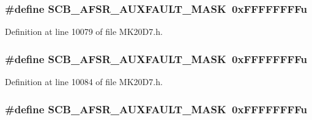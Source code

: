 \subsubsection[{\texorpdfstring{S\+C\+B\+\_\+\+A\+F\+S\+R\+\_\+\+A\+U\+X\+F\+A\+U\+L\+T\+\_\+\+M\+A\+SK}{SCB_AFSR_AUXFAULT_MASK}}]{\setlength{\rightskip}{0pt plus 5cm}\#define S\+C\+B\+\_\+\+A\+F\+S\+R\+\_\+\+A\+U\+X\+F\+A\+U\+L\+T\+\_\+\+M\+A\+SK~0x\+F\+F\+F\+F\+F\+F\+F\+Fu}\hypertarget{group___s_c_b___register___masks_ga7664f289a25c34670bd752c23fd47c8a}{}\label{group___s_c_b___register___masks_ga7664f289a25c34670bd752c23fd47c8a}


Definition at line 10079 of file M\+K20\+D7.\+h.

\subsubsection[{\texorpdfstring{S\+C\+B\+\_\+\+A\+F\+S\+R\+\_\+\+A\+U\+X\+F\+A\+U\+L\+T\+\_\+\+M\+A\+SK}{SCB_AFSR_AUXFAULT_MASK}}]{\setlength{\rightskip}{0pt plus 5cm}\#define S\+C\+B\+\_\+\+A\+F\+S\+R\+\_\+\+A\+U\+X\+F\+A\+U\+L\+T\+\_\+\+M\+A\+SK~0x\+F\+F\+F\+F\+F\+F\+F\+Fu}\hypertarget{group___s_c_b___register___masks_ga7664f289a25c34670bd752c23fd47c8a}{}\label{group___s_c_b___register___masks_ga7664f289a25c34670bd752c23fd47c8a}


Definition at line 10084 of file M\+K20\+D7.\+h.

\subsubsection[{\texorpdfstring{S\+C\+B\+\_\+\+A\+F\+S\+R\+\_\+\+A\+U\+X\+F\+A\+U\+L\+T\+\_\+\+M\+A\+SK}{SCB_AFSR_AUXFAULT_MASK}}]{\setlength{\rightskip}{0pt plus 5cm}\#define S\+C\+B\+\_\+\+A\+F\+S\+R\+\_\+\+A\+U\+X\+F\+A\+U\+L\+T\+\_\+\+M\+A\+SK~0x\+F\+F\+F\+F\+F\+F\+F\+Fu}\hypertarget{group___s_c_b___register___masks_ga7664f289a25c34670bd752c23fd47c8a}{}\label{group___s_c_b___register___masks_ga7664f289a25c34670bd752c23fd47c8a}


